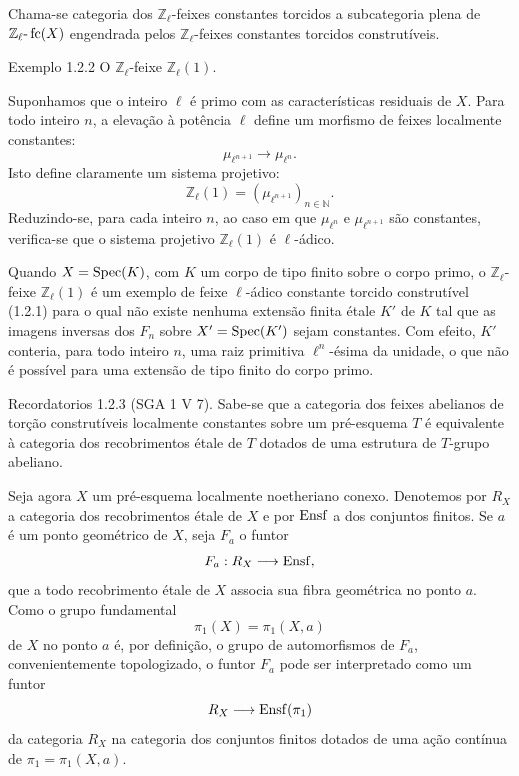 Chama-se categoria dos \(\mathbb Z_\ell\)-feixes constantes torcidos a subcategoria plena de \(\mathbb Z_\ell\text{-}\operatorname{fc}(X)\) engendrada pelos \(\mathbb Z_\ell\)-feixes constantes torcidos construtíveis.

\begin{statement}{Exemplo 1.2.2}
O \(\mathbb Z_\ell\)-feixe \(\mathbb Z_\ell(1)\).
\end{statement}

Suponhamos que o inteiro \(\ell\) é primo com as características residuais de \(X\). Para todo inteiro \(n\), a elevação à potência \(\ell\) define um morfismo de feixes localmente constantes:
\[
\mu_{\ell^{n+1}}\longrightarrow \mu_{\ell^n}.
\]
Isto define claramente um sistema projetivo:
\[
\mathbb Z_\ell(1)=(\mu_{\ell^{n+1}})_{n\in\mathbb N}.
\]
Reduzindo-se, para cada inteiro \(n\), ao caso em que \(\mu_{\ell^n}\) e \(\mu_{\ell^{n+1}}\) são constantes, verifica-se que o sistema projetivo \(\mathbb Z_\ell(1)\) é \(\ell\)-ádico.

Quando \(X=\operatorname{Spec}(K)\), com \(K\) um corpo de tipo finito sobre o corpo primo, o \(\mathbb Z_\ell\)-feixe \(\mathbb Z_\ell(1)\) é um exemplo de feixe \(\ell\)-ádico constante torcido construtível (1.2.1) para o qual não existe nenhuma extensão finita étale \(K'\) de \(K\) tal que as imagens inversas dos \(F_n\) sobre \(X'=\operatorname{Spec}(K')\) sejam constantes. Com efeito, \(K'\) conteria, para todo inteiro \(n\), uma raiz primitiva \(\ell^n\)-ésima da unidade, o que não é possível para uma extensão de tipo finito do corpo primo.

\begin{statement}{Recordatorios 1.2.3}
(SGA 1 V 7). Sabe-se que a categoria dos feixes abelianos de torção construtíveis localmente constantes sobre um pré-esquema \(T\) é equivalente à categoria dos recobrimentos étale de \(T\) dotados de uma estrutura de \(T\)-grupo abeliano.
\end{statement}

Seja agora \(X\) um pré-esquema localmente noetheriano conexo. Denotemos por \(R_X\) a categoria dos recobrimentos étale de \(X\) e por \(\operatorname{Ensf}\) a dos conjuntos finitos. Se \(a\) é um ponto geométrico de \(X\), seja \(F_a\) o funtor
\[
F_a:R_X\longrightarrow \operatorname{Ensf},
\]
que a todo recobrimento étale de \(X\) associa sua fibra geométrica no ponto \(a\). Como o grupo fundamental
\[
\pi_1(X)=\pi_1(X,a)
\]
de \(X\) no ponto \(a\) é, por definição, o grupo de automorfismos de \(F_a\), convenientemente topologizado, o funtor \(F_a\) pode ser interpretado como um funtor
\[
R_X\longrightarrow \operatorname{Ensf}(\pi_1)
\]
da categoria \(R_X\) na categoria dos conjuntos finitos dotados de uma ação contínua de \(\pi_1=\pi_1(X,a)\).

